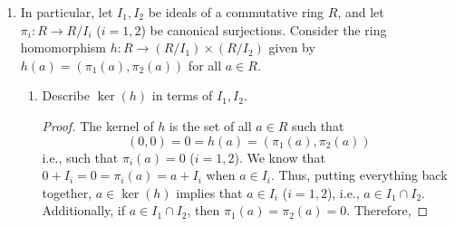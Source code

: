 \documentclass[../psets.tex]{subfiles}
\begin{document}
\begin{enumerate}
\begin{proof}
        To prove that $h$ is a ring homomorphism, it will suffice to show that $h$ respects addition and multiplication, and that $h(1_R)=1_{A\times B}$.\par
        Let $a_1,a_2\in R$ be arbitrary. Then
        \begin{align*}
            h(a_1+a_2) &= (f(a_1+a_2),g(a_1+a_2))\\
            &= (f(a_1)+f(a_2),g(a_1)+g(a_2))\\
            &= (f(a_1),g(a_1))+(f(a_2),g(a_2))\\
            &= h(a_1)+h(a_2)
        \end{align*}
        and
        \begin{align*}
            h(a_1\times a_2) &= (f(a_1\times a_2),g(a_1\times a_2))\\
            &= (f(a_1)\times f(a_2),g(a_1)\times g(a_2))\\
            &= (f(a_1),g(a_1))\times (f(a_2),g(a_2))\\
            &= h(a_1)\times h(a_2)
        \end{align*}
        Additionally,
        \begin{align*}
            h(1_R) &= (f(1_R),g(1_R))\\
            &= (1_A,1_B)\\
            &= 1_{A\times B}
        \end{align*}
        These three sets of equations give all of the desired results.
    \end{proof}
    \item In particular, let $I_1,I_2$ be ideals of a commutative ring $R$, and let $\pi_i:R\to R/I_i$ ($i=1,2$) be canonical surjections. Consider the ring homomorphism $h:R\to(R/I_1)\times(R/I_2)$ given by $h(a)=(\pi_1(a),\pi_2(a))$ for all $a\in R$.
    \begin{enumerate}[label={(\roman*)}]
        \item Describe $\ker(h)$ in terms of $I_1,I_2$.
        \begin{proof}
            The kernel of $h$ is the set of all $a\in R$ such that
            \begin{equation*}
                (0,0) = 0 = h(a) = (\pi_1(a),\pi_2(a))
            \end{equation*}
            i.e., such that $\pi_i(a)=0$ ($i=1,2$). We know that $0+I_i=0=\pi_i(a)=a+I_i$ when $a\in I_i$. Thus, putting everything back together, $a\in\ker(h)$ implies that $a\in I_i$ ($i=1,2$), i.e., $a\in I_1\cap I_2$. Additionally, if $a\in I_1\cap I_2$, then $\pi_1(a)=\pi_2(a)=0$. Therefore,

\end{proof}
\end{enumerate}
\end{enumerate}
\end{document}
